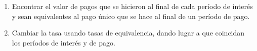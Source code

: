 \begin{enumerate}
	\item Encontrar el valor de pagos que se hicieron al final de cada período de interés y sean equivalentes al pago único que se hace al final de un período de pago.
	\item Cambiar la tasa usando tasas de equivalencia, dando lugar a que coincidan los períodos de interés y de pago.\\
\end{enumerate}



\newpage


















\cleardoublepage
{}
\setlength{\columnsep}{0.75cm}
\printindex

